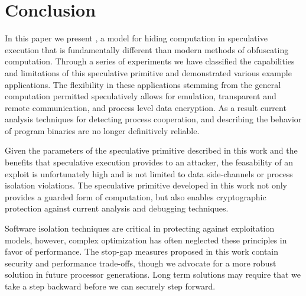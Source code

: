 
\section{Conclusion}

In this paper we present \speculake, a model for hiding computation in speculative 
execution that is fundamentally different than modern methods of obfuscating 
computation. Through a series of experiments we have classified the 
capabilities and limitations of this speculative primitive and demonstrated 
various example applications. The flexibility in these applications stemming 
from the general computation permitted speculatively allows for emulation, 
transparent and remote communication, and process level data encryption.  
As a result current analysis techniques for detecting process cooperation, 
and describing the behavior of program
binaries are no longer definitively reliable. 

Given the parameters of the speculative primitive described in this work and
the benefits that speculative execution provides to an attacker, the 
feasability of an \speculake exploit is unfortunately high and is not limited 
to data side-channels or process isolation violations. The speculative primitive 
developed in this work not only provides a guarded form of 
computation, but also enables cryptographic protection against current
analysis and debugging techniques.  

Software isolation techniques are critical in protecting against exploitation 
models, however, complex optimization has often neglected these principles in 
favor of performance. The stop-gap measures proposed in this work contain 
security and performance trade-offs, though we advocate for a more robust 
solution in future processor generations. Long term
solutions may require that we take a step backward before we can 
securely step forward.

